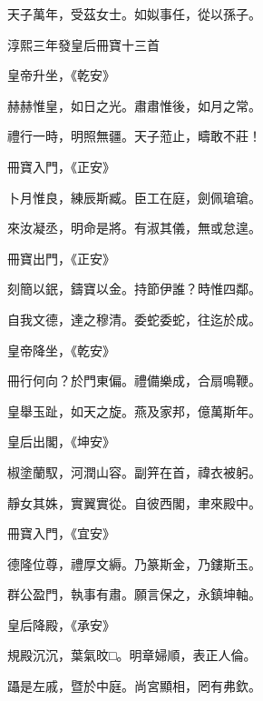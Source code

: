 \begin{pinyinscope}
 天子萬年，受茲女士。如姒事任，從以孫子。



 淳熙三年發皇后冊寶十三首



 皇帝升坐，《乾安》



 赫赫惟皇，如日之光。肅肅惟後，如月之常。



 禮行一時，明照無疆。天子蒞止，疇敢不莊！



 冊寶入門，《正安》



 卜月惟良，練辰斯臧。臣工在庭，劍佩瑲瑲。



 來汝凝丞，明命是將。有淑其儀，無或怠遑。



 冊寶出門，《正安》



 刻簡以鈱，鑄寶以金。持節伊誰？時惟四鄰。



 自我文德，達之穆清。委蛇委蛇，往迄於成。



 皇帝降坐，《乾安》



 冊行何向？於門東偏。禮備樂成，合扇鳴鞭。



 皇舉玉趾，如天之旋。燕及家邦，億萬斯年。



 皇后出閣，《坤安》



 椒塗蘭馭，河潤山容。副笄在首，禕衣被躬。



 靜女其姝，實翼實從。自彼西閣，聿來殿中。



 冊寶入門，《宜安》



 德隆位尊，禮厚文縟。乃篆斯金，乃鏤斯玉。



 群公盈門，執事有肅。願言保之，永鎮坤軸。



 皇后降殿，《承安》



 規殿沉沉，葉氣旼□。明章婦順，表正人倫。



 躡是左戚，暨於中庭。尚宮顯相，罔有弗欽。




\end{pinyinscope}
